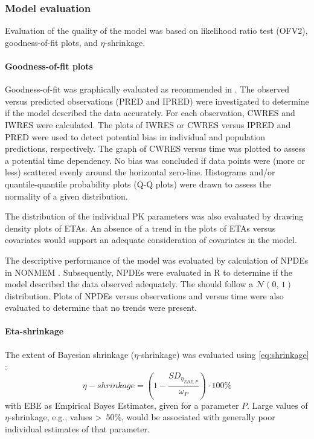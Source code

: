 \subsubsection{Model evaluation}
\label{sec:modelevaluation}

Evaluation of the quality of the model was based on likelihood ratio test (\gls{OFV2}), goodness-of-fit plots, and $\eta$-shrinkage.

\paragraph{Goodness-of-fit plots}$\;$\\

Goodness-of-fit was graphically evaluated  as recommended in \autocite{Nguyen2017}.  The observed versus predicted observations (\acrshort{PRED} and \acrshort{IPRED}) were investigated to determine if the model described the data accurately. For each observation, \gls{CWRES} and \gls{IWRES} were calculated. The plots of \gls{IWRES} or CWRES versus IPRED and PRED were used to detect potential bias in individual and population predictions, respectively. The graph of CWRES versus time was plotted to assess a potential time dependency. No bias was concluded if data points were (more or less) scattered evenly around the horizontal zero-line.  Histograms and/or quantile-quantile probability plots (Q-Q plots) were drawn  to assess the normality of a given distribution.

The distribution of the individual PK parameters was also evaluated by drawing density plots of \glspl{ETA}. An absence of a trend in the plots of \glspl{ETA} versus covariates would support an adequate consideration of covariates in the model.

The descriptive performance of the model was evaluated by calculation of \glspl{NPDE} in NONMEM \autocite{Comets2008, Nguyen2012}.  Subsequently, NPDEs were evaluated in R to determine if the model described the data observed adequately. The  should follow a $\mathcal{N}(0,\,1)$ distribution. Plots of NPDEs versus observations and versus time were also evaluated to determine that no trends were present.

\paragraph{Eta-shrinkage}$\;$\\

The extent of Bayesian shrinkage ($\eta$-shrinkage) was evaluated using \cref{eq:shrinkage} \autocite{Savic2009}:
%
\begin{equation} 
  \label{eq:shrinkage}
\eta - shrinkage = \left(1 - \frac{SD_{\eta_{EBE,P}}}{\omega_{P}}\right) \cdot 100\% 
\end{equation}
%
with EBE as Empirical Bayes Estimates, given for a parameter $P$. Large values of $\eta$-shrinkage, e.g., values >~50\%,  would be associated with generally poor individual estimates of that parameter.

